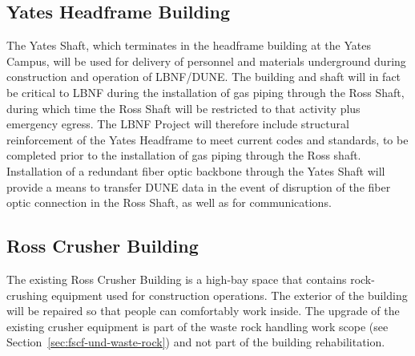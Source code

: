 \subsection{Yates Headframe Building}
\label{sec:fscf-surf-facil-surface-bldg-yateshead}

The Yates Shaft, which terminates in the headframe building at the Yates Campus, will be used for delivery of personnel and materials underground during construction and operation of LBNF/DUNE.
The building and shaft will in fact be critical to LBNF during the installation of gas piping through the Ross Shaft, during which time the Ross Shaft will be restricted to that activity plus emergency egress.   The LBNF Project will therefore include structural reinforcement of the Yates Headframe to meet current codes and standards, to be completed prior to the installation of gas piping through the Ross shaft. %
Installation of a redundant fiber optic backbone through the Yates Shaft will provide a means to transfer DUNE data in the event of disruption of the fiber optic connection in the Ross Shaft, as well as for communications.



\subsection{Ross Crusher Building}
\label{sec:fscf-surf-facil-surface-bldg-rosscrusher}

The existing Ross Crusher Building is a high-bay space that contains rock-crushing equipment used for construction operations. The exterior of the building will be repaired 
so that people can comfortably work inside. %
The upgrade of the existing crusher equipment is part of the waste rock handling work scope (see Section~\ref{sec:fscf-und-waste-rock}) and not part of the building rehabilitation. 

